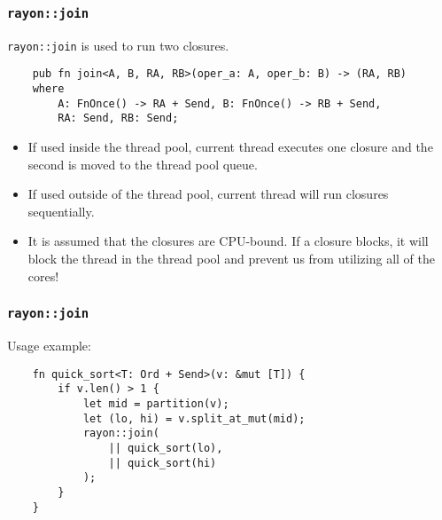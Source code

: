 \documentclass[aspectratio=1610,t]{beamer}
\begin{document}

\begin{frame}[fragile]
\frametitle{\texttt{rayon::join}}
\texttt{rayon::join} is used to run two closures.

\begin{verbatim}
    pub fn join<A, B, RA, RB>(oper_a: A, oper_b: B) -> (RA, RB)
    where
        A: FnOnce() -> RA + Send, B: FnOnce() -> RB + Send,
        RA: Send, RB: Send;
\end{verbatim}

\begin{itemize}
    \item<2-> If used inside the thread pool, current thread executes one closure and the second is moved to the thread pool queue.
    \item<3-> If used outside of the thread pool, current thread will run closures sequentially.
    \item<4-> It is assumed that the closures are CPU-bound. If a closure blocks, it will block the thread in the thread pool and prevent us from utilizing all of the cores!
\end{itemize}
\end{frame}


\begin{frame}[fragile]
\frametitle{\texttt{rayon::join}}
Usage example:

\begin{verbatim}
    fn quick_sort<T: Ord + Send>(v: &mut [T]) {
        if v.len() > 1 {
            let mid = partition(v);
            let (lo, hi) = v.split_at_mut(mid);
            rayon::join(
                || quick_sort(lo),
                || quick_sort(hi)
            );
        }
    }
\end{verbatim}
\end{frame}

\end{document}
